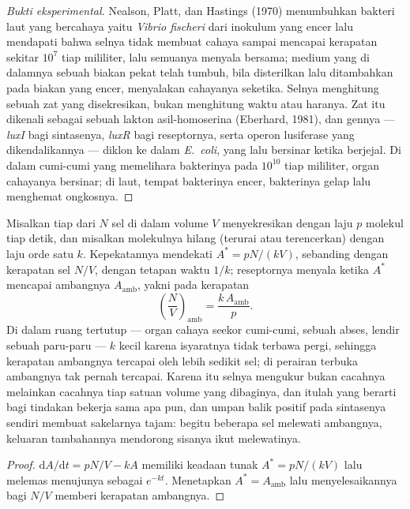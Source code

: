 \begin{proof}[Bukti eksperimental]
Nealson, Platt, dan Hastings (1970) menumbuhkan bakteri laut yang bercahaya
yaitu \emph{Vibrio fischeri} dari inokulum yang encer lalu mendapati bahwa
selnya tidak membuat cahaya sampai mencapai kerapatan sekitar $10^{7}$ tiap
mililiter, lalu semuanya menyala bersama; medium yang di dalamnya sebuah biakan
pekat telah tumbuh, bila disterilkan lalu ditambahkan pada biakan yang encer,
menyalakan cahayanya seketika. Selnya menghitung sebuah zat yang disekresikan,
bukan menghitung waktu atau haranya. Zat itu dikenali sebagai sebuah lakton
asil-homoserina (Eberhard, 1981), dan gennya --- \emph{luxI} bagi sintasenya,
\emph{luxR} bagi reseptornya, serta operon lusiferase yang dikendalikannya ---
diklon ke dalam \emph{E.~coli}, yang lalu bersinar ketika berjejal. Di dalam
cumi-cumi yang memelihara bakterinya pada $10^{10}$ tiap mililiter, organ
cahayanya bersinar; di laut, tempat bakterinya encer, bakterinya gelap lalu
menghemat ongkosnya.
\end{proof}

\begin{proposition}\label{prop:b3:bacteriology:threshold}
Misalkan tiap dari $N$ sel di dalam volume $V$ menyekresikan 
dengan laju $p$ molekul tiap detik, dan misalkan molekulnya hilang (terurai
atau terencerkan) dengan laju orde satu $k$. Kepekatannya mendekati
$A^{*} = pN/(kV)$, sebanding dengan kerapatan sel $N/V$, dengan
tetapan waktu $1/k$; reseptornya menyala ketika $A^{*}$ mencapai
ambangnya $A_{\text{amb}}$, yakni pada kerapatan
\[
\left(\frac{N}{V}\right)_{\text{amb}} = \frac{k\,A_{\text{amb}}}{p}.
\]
Di dalam ruang tertutup --- organ cahaya seekor cumi-cumi, sebuah abses, lendir
sebuah paru-paru --- $k$ kecil karena isyaratnya tidak terbawa pergi, sehingga
kerapatan ambangnya tercapai oleh lebih sedikit sel; di perairan terbuka
ambangnya tak pernah tercapai. Karena itu selnya mengukur bukan cacahnya
melainkan cacahnya tiap satuan volume yang dibaginya, dan itulah yang berarti
bagi tindakan bekerja sama apa pun, dan umpan balik positif 
pada sintasenya sendiri membuat sakelarnya tajam: begitu beberapa sel melewati
ambangnya, keluaran tambahannya mendorong sisanya ikut melewatinya.
\end{proposition}
\begin{proof}
$\mathrm{d}A/\mathrm{d}t = pN/V - kA$ memiliki keadaan tunak $A^{*} =
pN/(kV)$ lalu melemas menujunya sebagai $e^{-kt}$. Menetapkan $A^{*} = A_{\text{amb}}$
lalu menyelesaikannya bagi $N/V$ memberi kerapatan ambangnya.
\end{proof}

